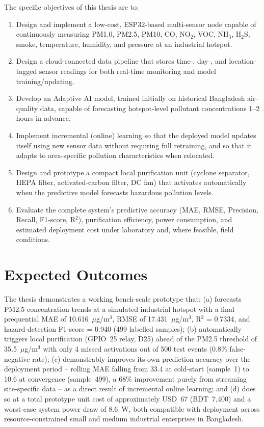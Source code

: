 The specific objectives of this thesis are to:

\begin{enumerate}
    \item Design and implement a low-cost, ESP32-based multi-sensor node capable of continuously measuring PM1.0, PM2.5, PM10, CO, NO$_2$, VOC, NH$_3$, H$_2$S, smoke, temperature, humidity, and pressure at an industrial hotspot.
    \item Design a cloud-connected data pipeline that stores time-, day-, and location-tagged sensor readings for both real-time monitoring and model training/updating.
    \item Develop an Adaptive AI model, trained initially on historical Bangladesh air-quality data, capable of forecasting hotspot-level pollutant concentrations 1--2 hours in advance.
    \item Implement incremental (online) learning so that the deployed model updates itself using new sensor data without requiring full retraining, and so that it adapts to area-specific pollution characteristics when relocated.
    \item Design and prototype a compact local purification unit (cyclone separator, HEPA filter, activated-carbon filter, DC fan) that activates automatically when the predictive model forecasts hazardous pollution levels.
    \item Evaluate the complete system's predictive accuracy (MAE, RMSE, Precision, Recall, F1-score, R$^2$), purification efficiency, power consumption, and estimated deployment cost under laboratory and, where feasible, field conditions.
\end{enumerate}

\section{Expected Outcomes}
\label{sec:expected-outcomes}

The thesis demonstrates a working bench-scale prototype that: (a) forecasts PM2.5 concentration trends at a simulated industrial hotspot with a final prequential MAE of 10.616~$\mu$g/m$^3$, RMSE of 17.431~$\mu$g/m$^3$, R$^2$ = 0.7334, and hazard-detection F1-score = 0.940 (499 labelled samples); (b) automatically triggers local purification (GPIO~25 relay, D25) ahead of the PM2.5 threshold of 35.5~$\mu$g/m$^3$ with only 4 missed activations out of 500 test events (0.8\% false-negative rate); (c) demonstrably improves its own prediction accuracy over the deployment period -- rolling MAE falling from 33.4 at cold-start (sample~1) to 10.6 at convergence (sample~499), a 68\% improvement purely from streaming site-specific data -- as a direct result of incremental online learning; and (d) does so at a total prototype unit cost of approximately USD~67 (BDT~7,400) and a worst-case system power draw of 8.6~W, both compatible with deployment across resource-constrained small and medium industrial enterprises in Bangladesh.

